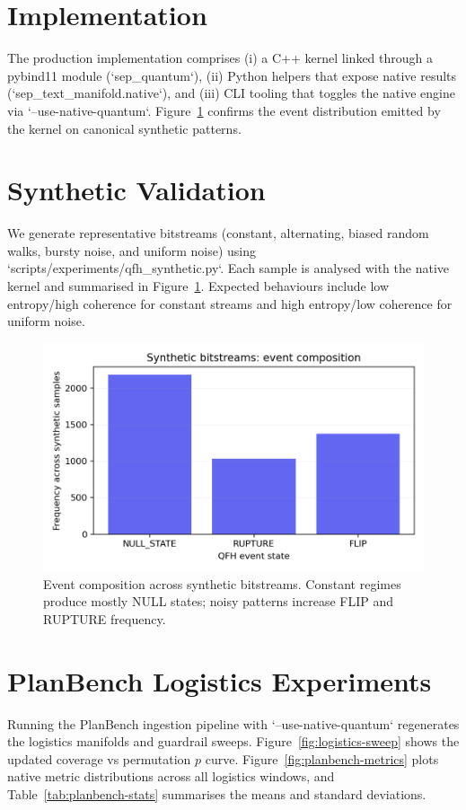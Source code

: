 \documentclass[11pt]{article}
\begin{document}
\section{Implementation}
The production implementation comprises (i) a C++ kernel linked through a pybind11 module (`sep\_quantum`), (ii) Python helpers that expose native results (`sep\_text\_manifold.native`), and (iii) CLI tooling that toggles the native engine via `--use-native-quantum`. Figure~\ref{fig:synthetic-events} confirms the event distribution emitted by the kernel on canonical synthetic patterns.

\section{Synthetic Validation}
We generate representative bitstreams (constant, alternating, biased random walks, bursty noise, and uniform noise) using `scripts/experiments/qfh\_synthetic.py`. Each sample is analysed with the native kernel and summarised in Figure~\ref{fig:synthetic-events}. Expected behaviours include low entropy/high coherence for constant streams and high entropy/low coherence for uniform noise.

\begin{figure}[t]
  \centering
  \includegraphics[width=0.75\linewidth]{../figures/fig0_synthetic_event_hist.png}
  \caption{Event composition across synthetic bitstreams. Constant regimes produce mostly NULL states; noisy patterns increase FLIP and RUPTURE frequency.}
  \label{fig:synthetic-events}
\end{figure}

\section{PlanBench Logistics Experiments}
Running the PlanBench ingestion pipeline with `--use-native-quantum` regenerates the logistics manifolds and guardrail sweeps. Figure~\ref{fig:logistics-sweep} shows the updated coverage vs permutation $p$ curve. Figure~\ref{fig:planbench-metrics} plots native metric distributions across all logistics windows, and Table~\ref{tab:planbench-stats} summarises the means and standard deviations.
\end{document}
